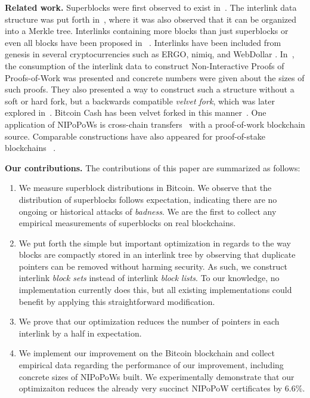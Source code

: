 \noindent
\textbf{Related work.}
Superblocks were first observed to exist in~\cite{highway}.
The interlink data structure was put forth in~\cite{popow}, where it was also
observed that it can be organized into a Merkle tree. Interlinks containing more
blocks than just superblocks or even all blocks have been
proposed in~\cite{vitalik-eip,flyclient} . Interlinks have
been included from genesis in several cryptocurrencies such as ERGO, nimiq, and
WebDollar . In~\cite{nipopows}, the consumption of the
interlink data to construct Non-Interactive Proofs of Proofs-of-Work was
presented and concrete numbers were given about the sizes of such proofs. They
also presented a way to construct such a structure without a soft or hard fork,
but a backwards compatible \emph{velvet fork}, which was later explored
in~\cite{velvet}. Bitcoin Cash has been velvet forked in this
manner~\cite{gtklocker}. One application of NIPoPoWs is cross-chain
transfers~\cite{pow-sidechains}  with a proof-of-work
blockchain source. Comparable constructions have also appeared for
proof-of-stake blockchains~\cite{pos-sidechains} .

\noindent
\textbf{Our contributions.} The contributions of this paper are summarized as
follows:

\begin{enumerate}
  \item We measure superblock distributions in Bitcoin. We observe that the
        distribution of superblocks follows expectation, indicating there are no
        ongoing or historical attacks of \emph{badness}. We are the first to
        collect any empirical measurements of superblocks on real blockchains.
  \item We put forth the simple but important optimization in regards to the way
        blocks are compactly stored in an interlink tree by observing that
        duplicate pointers can be removed without harming security. As such, we
        construct interlink \emph{block sets} instead of interlink \emph{block
        lists}. To our knowledge, no implementation currently does this, but all
        existing implementations could benefit by applying this straightforward
        modification.
  \item We prove that our optimization reduces the number of pointers in each
        interlink by a half in expectation.
  \item We implement our improvement on the Bitcoin blockchain and collect
        empirical data regarding the performance of our improvement, including
        concrete sizes of NIPoPoWs built. We experimentally demonstrate that our
        optimizaiton reduces the already very succinct NIPoPoW certificates by
        $6.6\%$.
\end{enumerate}

